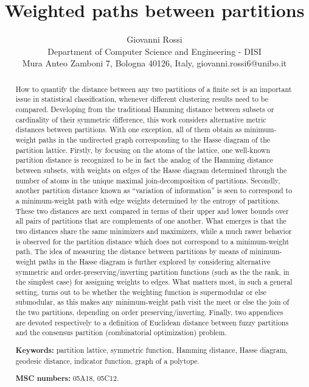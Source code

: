 \documentclass[a4paper,10pt]{article}
\title{Weighted paths between partitions}
\author{Giovanni Rossi\\
\footnotesize{Department of Computer Science and Engineering - DISI}\\
\footnotesize{Mura Anteo Zamboni 7, Bologna 40126, Italy, giovanni.rossi6@unibo.it}}
\begin{document}
\maketitle

\begin{abstract}
How to quantify the distance between any two partitions of a finite set is an important issue in statistical classification, whenever different clustering results
need to be compared. Developing from the traditional Hamming distance between subsets or cardinality of their symmetric difference, this work considers alternative
metric distances between partitions. With one exception, all of them obtain as minimum-weight paths in the undirected graph corresponding to the Hasse diagram of the
partition lattice. Firstly, by focusing on the atoms of the lattice, one well-known partition distance is recognized to be in fact the analog of the Hamming distance
between subsets, with weights on edges of the Hasse diagram determined through the number of atoms in the unique maximal join-decomposition of partitions. Secondly,
another partition distance known as ``variation of information'' is seen to correspond to a minimum-weight path with edge weights determined by the entropy of
partitions. These two distances are next compared in terms of their upper and lower bounds over all pairs of partitions that are complements of one another. What
emerges is that the two distances share the same minimizers and maximizers, while a much rawer behavior is observed for the partition distance which does not 
correspond to a minimum-weight path. The idea of measuring the distance between partitions by means of minimum-weight paths in the Hasse diagram is further explored
by considering alternative symmetric and order-preserving/inverting partition functions (such as the the rank, in the simplest case) for assigning weights to edges.
What matters most, in such a general setting, turns out to be whether the weighting function is supermodular or else submodular, as this makes any minimum-weight path
visit the meet or else the join of the two partitions, depending on order preserving/inverting. Finally, two appendices are devoted respectively to a definition of
Euclidean distance between fuzzy partitions and the consensus partition (combinatorial optimization) problem.

\textbf{Keywords:} partition lattice, symmetric function, Hamming distance, Hasse diagram, geodesic distance, indicator function, graph of a polytope.

\textbf{MSC numbers:} 05A18, 05C12.
\end{abstract}
\end{document}
